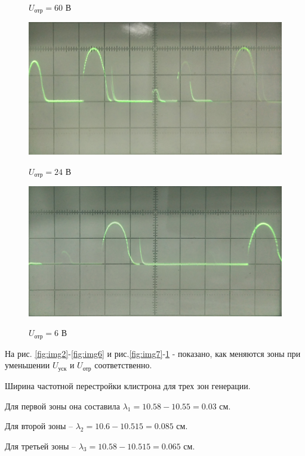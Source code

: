 \begin{figure}[h]
\begin{minipage}[h]{0.45\linewidth}
		\caption{$U_{\text{отр}}=60$ В}
		\label{fig:img9}
	\end{minipage}
	\hfill
	\begin{minipage}[h]{0.45\textwidth}
		\centering
		{\includegraphics[width=\textwidth]{img/img10}}
		\caption{$U_{\text{отр}}=24$ В}
		\label{fig:img10}
	\end{minipage}

		\begin{minipage}[h]{0.45\textwidth}
		\centering
		{\includegraphics[width=\textwidth]{img/img11}}
		\caption{$U_{\text{отр}}=6$ В}
		\label{fig:img11}
	\end{minipage}
\end{figure}
На рис. \ref{fig:img2}-\ref{fig:img6}  и рис.\ref{fig:img7}-\ref{fig:img11} - показано, как меняются зоны при уменьшении $U_{\text{уск}}$ и $U_{\text{отр}}$ соответственно. 

Ширина частотной перестройки клистрона для трех зон генерации.

Для первой зоны она составила $\lambda_1=10.58-10.55=0.03$ см.

Для второй зоны -- $\lambda_2=10.6-10.515=0.085$ см.

Для третьей зоны -- $\lambda_3=10.58-10.515=0.065$ см.
